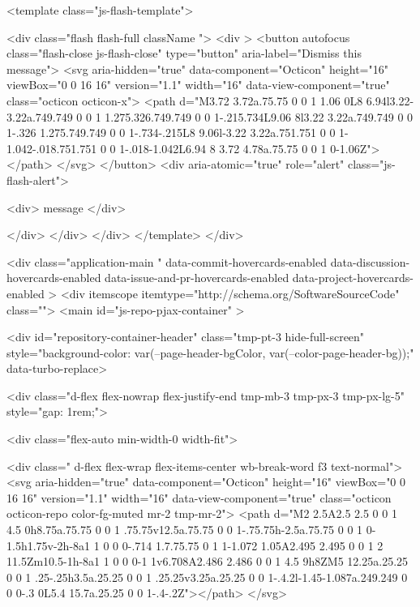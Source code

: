   <template class="js-flash-template">
    
<div class="flash flash-full   {{ className }}">
  <div >
    <button autofocus class="flash-close js-flash-close" type="button" aria-label="Dismiss this message">
      <svg aria-hidden="true" data-component="Octicon" height="16" viewBox="0 0 16 16" version="1.1" width="16" data-view-component="true" class="octicon octicon-x">
    <path d="M3.72 3.72a.75.75 0 0 1 1.06 0L8 6.94l3.22-3.22a.749.749 0 0 1 1.275.326.749.749 0 0 1-.215.734L9.06 8l3.22 3.22a.749.749 0 0 1-.326 1.275.749.749 0 0 1-.734-.215L8 9.06l-3.22 3.22a.751.751 0 0 1-1.042-.018.751.751 0 0 1-.018-1.042L6.94 8 3.72 4.78a.75.75 0 0 1 0-1.06Z"></path>
</svg>
    </button>
    <div aria-atomic="true" role="alert" class="js-flash-alert">
      
      <div>{{ message }}</div>

    </div>
  </div>
</div>
  </template>
</div>


    






  <div
    class="application-main "
    data-commit-hovercards-enabled
    data-discussion-hovercards-enabled
    data-issue-and-pr-hovercards-enabled
    data-project-hovercards-enabled
  >
        <div itemscope itemtype="http://schema.org/SoftwareSourceCode" class="">
    <main id="js-repo-pjax-container" >
      
      






  

  <div id="repository-container-header"  class="tmp-pt-3 hide-full-screen" style="background-color: var(--page-header-bgColor, var(--color-page-header-bg));" data-turbo-replace>

      <div class="d-flex flex-nowrap flex-justify-end tmp-mb-3  tmp-px-3 tmp-px-lg-5" style="gap: 1rem;">

        <div class="flex-auto min-width-0 width-fit">
            
  <div class=" d-flex flex-wrap flex-items-center wb-break-word f3 text-normal">
      <svg aria-hidden="true" data-component="Octicon" height="16" viewBox="0 0 16 16" version="1.1" width="16" data-view-component="true" class="octicon octicon-repo color-fg-muted mr-2 tmp-mr-2">
    <path d="M2 2.5A2.5 2.5 0 0 1 4.5 0h8.75a.75.75 0 0 1 .75.75v12.5a.75.75 0 0 1-.75.75h-2.5a.75.75 0 0 1 0-1.5h1.75v-2h-8a1 1 0 0 0-.714 1.7.75.75 0 1 1-1.072 1.05A2.495 2.495 0 0 1 2 11.5Zm10.5-1h-8a1 1 0 0 0-1 1v6.708A2.486 2.486 0 0 1 4.5 9h8ZM5 12.25a.25.25 0 0 1 .25-.25h3.5a.25.25 0 0 1 .25.25v3.25a.25.25 0 0 1-.4.2l-1.45-1.087a.249.249 0 0 0-.3 0L5.4 15.7a.25.25 0 0 1-.4-.2Z"></path>
</svg>
    
